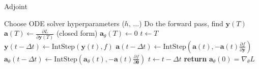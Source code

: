 \documentclass[11pt]{report}
\begin{document}
    \begin{algorithm}
        \caption{Adjoint}
        \label{alg:adjoint}
        \begin{algorithmic}
            \State Choose ODE solver hyperparameters ($h$, $\dots$)
            \State Do the forward pass, find $\pmb{y}(T)$
            \State $\pmb{a}(T) \gets \frac{\partial L}{\partial \pmb{y}(T)}$ (closed form)
            \State $\pmb{a}_{\theta}(T) \gets 0$
            \State $t \gets T$
                \State $\pmb{y}(t - \Delta t) \gets \text{IntStep}(\pmb{y}(t), f) $
                \State $\pmb{a}(t - \Delta t) \gets \text{IntStep}(
                \pmb{a}(t), -\pmb{a}(t) \frac{\partial f }{\partial \pmb{y}}
                )$
                \State $\pmb{a}_{\theta}(t - \Delta t) \gets \text{IntStep}(
                \pmb{a}_{\theta}(t), -\pmb{a}(t) \frac{\partial f }{\partial \pmb{\theta}}
                )$
                \State $t \gets t - \Delta t$
            \EndWhile
            \State \textbf{return} $\pmb{a}_\theta(0) = \nabla_\theta L$
        \end{algorithmic}
    \end{algorithm}
\end{document}
